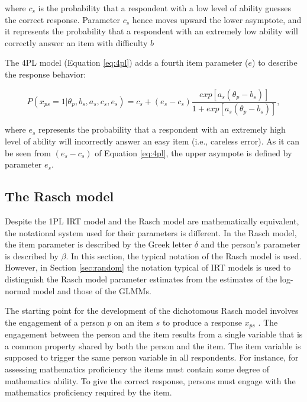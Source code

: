 \documentclass[12pt]{book}
\begin{document}
where $c_s$ is the probability that a respondent with a low level of ability guesses the correct response. Parameter $c_s$ hence moves upward the lower asymptote, and it represents the probability that a respondent with an extremely low ability will correctly answer an item with difficulty $b$ 

The 4PL model (Equation \ref{eq:4pl}) \cite{4plbarton} adds a fourth item parameter ($e$) to describe the response behavior:

\begin{equation}\label{eq:4pl}
P(x_{ps} = 1 | \theta_p, b_s, a_s, c_s, e_s) = c_s + (e_s-c_s)\frac{exp[a_s(\theta_p - b_s)]}{1 + exp[a_s(\theta_p - b_s)]},
\end{equation} 

where $e_s$ represents the probability that a respondent with an extremely high level of ability will incorrectly answer an easy item (i.e., careless error). As it can be seen from $(e_s-c_s)$ of Equation \ref{eq:4pl}, the upper asympote is defined by parameter $e_s$. 


\subsection{The Rasch model}

Despite the 1PL IRT model and the Rasch model are mathematically equivalent, the notational system used for their parameters is different. In the Rasch model, the item parameter is described by the Greek letter $\delta$ and the person's parameter is described by $\beta$. 
In this section, the typical notation of the Rasch model is used. However, in Section \ref{sec:random} the notation typical of IRT models is used to distinguish the Rasch model parameter estimates from the estimates of the log-normal model and those of the GLMMs.

The starting point for the development of the dichotomous Rasch model \cite{rasch1960} involves the engagement of a person $p$ on an item $s$ to produce a response $x_{ps}$ \cite{andrich}. 
The engagement between the person and the item results from a single variable that is a common property shared by both the person and the item. The item variable is supposed to trigger the same person variable in all respondents.
For instance, for assessing mathematics proficiency the items must contain some degree of mathematics ability. To give the correct response, persons must engage with the mathematics proficiency required by the item.   
\end{document}
